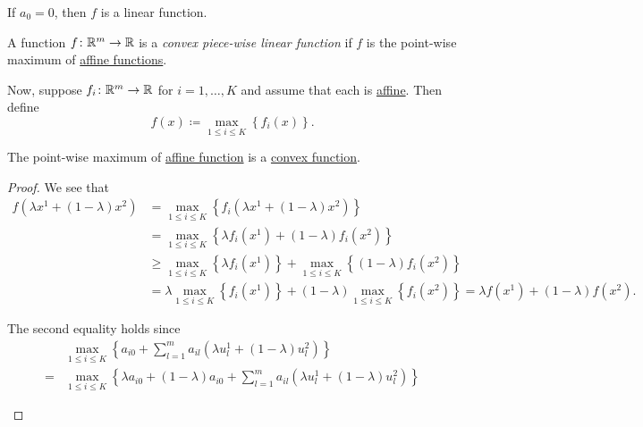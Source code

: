 \begin{remark}
	If \(a_0 = 0\), then \(f\) is a linear function.
\end{remark}

\begin{definition}\label{def:convex-piece-wise-linear-function}
	A function \(f\colon \mathbb{\MakeUppercase{R}}^{m}\to \mathbb{\MakeUppercase{R}}\) is a \emph{convex piece-wise linear function} if
	\(f\) is the point-wise maximum of \hyperref[def:affine-function]{affine functions}.
	\begin{figure}[H]
		\centering
		\label{fig:convex-piecewise-linear-function}
	\end{figure}
\end{definition}

Now, suppose \(f_{i}\colon \mathbb{\MakeUppercase{R}}^m \to \mathbb{\MakeUppercase{R}}\) for \(i = 1, \ldots , K\) and assume that each is \hyperref[def:affine-function]{affine}.
Then define
\[
	f(x)\coloneqq \max_{1\leq i\leq K} \left\{ f_i(x) \right\}.
\]

\begin{theorem}
	The point-wise maximum of \hyperref[def:affine-function]{affine function} is a \hyperref[def:convex-function]{convex function}.
\end{theorem}
\begin{proof}
	We see that
	\[
		\begin{split}
			f(\lambda x^1 + (1 - \lambda)x^2) &=\max_{1\leq i\leq K}\left\{ f_i(\lambda x^1 + (1 - \lambda)x^2) \right\}\\
			&=\max_{1\leq i\leq K}\left\{ \lambda f_{i}(x^1) + (1 - \lambda)f_{i}(x^2) \right\}\\
			&\geq \max_{1\leq i\leq K}\left\{ \lambda f_{i}(x^1)\right\} + \max_{1\leq i\leq K}\left\{(1 - \lambda)f_{i}(x^2) \right\}\\
			&=\lambda\max_{1\leq i\leq K}\left\{f_{i}(x^1)\right\} + (1 - \lambda)\max_{1\leq i\leq K}\left\{f_{i}(x^2) \right\}
			= \lambda f(x^1)+(1 - \lambda)f(x^2).
		\end{split}
	\]
	\begin{remark}
		The second equality holds since
		\[
			\begin{split}
				&\max_{1\leq i\leq K}\left\{ a_{i0}+\sum\limits_{l=1}^{m} a_{il}(\lambda u^1_l + (1 - \lambda)u^2_l) \right\}\\
				= &\max_{1\leq i\leq K}\left\{ \lambda a_{i0}+(1 - \lambda)a_{i0} + \sum\limits_{l=1}^{m} a_{il}(\lambda u^1_l + (1 - \lambda)u^2_l) \right\}
			\end{split}
		\]
	\end{remark}
\end{proof}